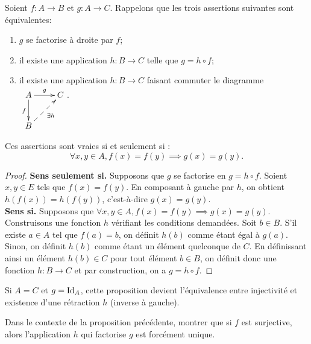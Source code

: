 \begin{proposition}
\label{factorisation-droite}
Soient $f : A\to B$ et $g : A\to C$. Rappelons que les trois assertions suivantes sont équivalentes:
\begin{enumerate}
\item  $g$ se factorise à droite par $f$;
\item il existe une application $h : B\to C$ telle que $g = h\circ f$;
\item il existe une application $h : B\to C$ faisant commuter  le diagramme  
$\xymatrix{
A \ar[r]^g \ar[d]_{f}& C\\
B \ar@{-->}[ur]_{\exists h}& 
}$.
\end{enumerate}
Ces assertions sont vraies si et seulement si :
\[\forall x, y \in A, f(x)=f(y) \implies g(x)=g(y).\]
\end{proposition}
\begin{proof}
\textbf{Sens \og seulement si\fg.} Supposons que $g$ se factorise en $g = h\circ f$. Soient $x, y\in E$ tels que $f(x)=f(y)$. En composant à gauche par $h$, on obtient $h(f(x)) = h(f(y))$, c'est-à-dire $g(x)=g(y)$.\\
\textbf{Sens \og si\fg.} Supposons que $\forall x, y \in A, f(x)=f(y) \implies g(x)=g(y)$. Construisons une fonction $h$ vérifiant les conditions demandées. Soit $b\in B$. S'il existe $a\in A$ tel que $f(a)=b$, on définit $h(b)$ comme étant égal à $g(a)$. Sinon, on définit $h(b)$ comme étant un élément quelconque de $C$. En définissant ainsi un élément $h(b)\in C$ pour tout élément $b\in B$, on définit donc une fonction $h : B\to C$ et par construction, on a $g = h\circ f$.
\end{proof}

\begin{remarque} Si $A=C$ et $g=\operatorname{Id}_A$, cette proposition devient l'équivalence entre injectivité et existence d'une rétraction $h$ (inverse à gauche).
\end{remarque}

\begin{exercice}
Dans le contexte de la proposition précédente, montrer que si $f$ est surjective, alors l'application $h$ qui factorise $g$ est forcément unique.
\end{exercice}


